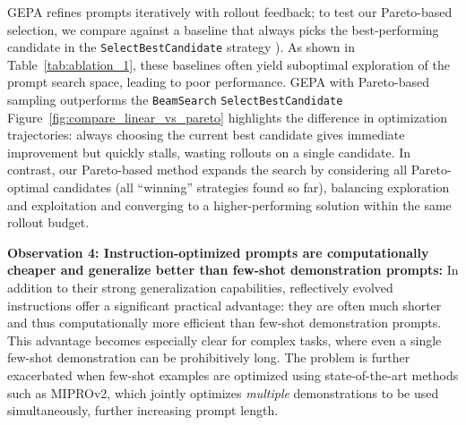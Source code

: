 \documentclass{article} %
\begin{document}
GEPA refines prompts iteratively with rollout feedback; to test our Pareto-based selection, we compare against a baseline that always picks the best-performing candidate in the \lstinline{SelectBestCandidate} strategy ).
As shown in Table~\ref{tab:ablation_1}, these baselines often yield suboptimal exploration of the prompt search space, leading to poor performance. GEPA with Pareto-based sampling outperforms the \texttt{BeamSearch}  \texttt{SelectBestCandidate}  Figure~\ref{fig:compare_linear_vs_pareto} highlights the difference in optimization trajectories: always choosing the current best candidate gives immediate improvement but quickly stalls, wasting rollouts on a single candidate. In contrast, our Pareto-based method expands the search by considering all Pareto-optimal candidates (all ``winning'' strategies found so far), balancing exploration and exploitation and converging to a higher-performing solution within the same rollout budget.


\textbf{Observation 4: Instruction-optimized prompts are computationally cheaper and generalize better than few-shot demonstration prompts:} In addition to their strong generalization capabilities, reflectively evolved instructions offer a significant practical advantage: they are often much shorter and thus computationally more efficient than few-shot demonstration prompts. This advantage becomes especially clear for complex tasks, where even a single few-shot demonstration can be prohibitively long. The problem is further exacerbated when few-shot examples are optimized using state-of-the-art methods such as MIPROv2, which jointly optimizes \textit{multiple} demonstrations to be used simultaneously, further increasing prompt length.
\end{document}
